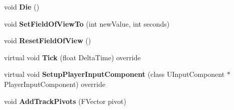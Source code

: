 \begin{DoxyCompactItemize}
void {\bfseries Die} ()
\item 
\mbox{\label{class_a_temp_player_a1ea1ea9ebe5cc51e792337cabe05fdf6}} 
void {\bfseries Set\+Field\+Of\+View\+To} (int new\+Value, int seconds)
\item 
\mbox{\label{class_a_temp_player_acdf7ec422b79ce05771bdb87c2e8a14f}} 
void {\bfseries Reset\+Field\+Of\+View} ()
\item 
\mbox{\label{class_a_temp_player_a4c46d5d1efb214eb30115dd4a8d50260}} 
virtual void {\bfseries Tick} (float Delta\+Time) override
\item 
\mbox{\label{class_a_temp_player_a91ed4730cf7f8252919b5002a0353189}} 
virtual void {\bfseries Setup\+Player\+Input\+Component} (class U\+Input\+Component $\ast$Player\+Input\+Component) override
\item 
\mbox{\label{class_a_temp_player_af6cc1013fc003bcff6db93a3d3d595f6}} 
void {\bfseries Add\+Track\+Pivots} (F\+Vector pivot)
\end{DoxyCompactItemize}
